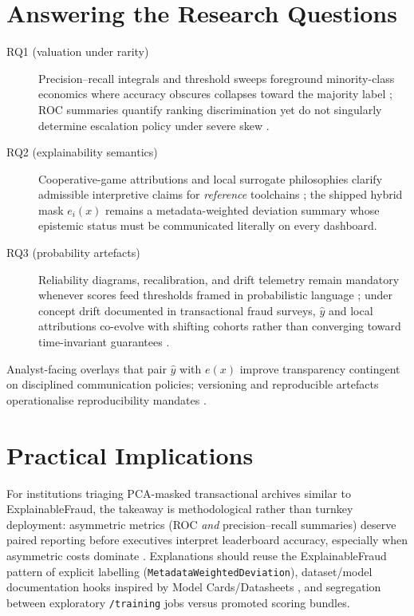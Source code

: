 \section{Answering the Research Questions}
\begin{description}
    \item[RQ1 (valuation under rarity)] Precision--recall integrals and threshold sweeps foreground minority-class economics where accuracy obscures collapses toward the majority label \cite{davis_goadrich_icml06,fraud_handbook}; ROC summaries quantify ranking discrimination yet do not singularly determine escalation policy under severe skew \cite{davis_goadrich_icml06}.
    \item[RQ2 (explainability semantics)] Cooperative-game attributions and local surrogate philosophies clarify admissible interpretive claims for \emph{reference} toolchains \cite{lime_original,shap_original,slack2020_fooling_lime_shap}; the shipped hybrid mask $e_i(x)$ remains a metadata-weighted deviation summary whose epistemic status must be communicated literally on every dashboard.
    \item[RQ3 (probability artefacts)] Reliability diagrams, recalibration, and drift telemetry remain mandatory whenever scores feed thresholds framed in probabilistic language \cite{niculescu_caruana_calib2005}; under concept drift documented in transactional fraud surveys, $\hat{y}$ and local attributions co-evolve with shifting cohorts rather than converging toward time-invariant guarantees \cite{lucas_jurgovsky_ccfraud_survey2020}.
\end{description}

Analyst-facing overlays that pair $\hat{y}$ with $e(x)$ improve transparency contingent on disciplined communication policies; versioning and reproducible artefacts operationalise reproducibility mandates \cite{xai_survey}.

\section{Practical Implications}
For institutions triaging PCA-masked transactional archives similar to ExplainableFraud, the takeaway is methodological rather than turnkey deployment: asymmetric metrics (ROC \emph{and} precision--recall summaries) deserve paired reporting before executives interpret leaderboard accuracy, especially when asymmetric costs dominate \cite{davis_goadrich_icml06,fraud_handbook}. Explanations should reuse the ExplainableFraud pattern of explicit labelling (\texttt{MetadataWeightedDeviation}), dataset/model documentation hooks inspired by Model Cards/Datasheets \cite{mitchell2019model_cards,gebru2021datasheets}, and segregation between exploratory \texttt{/training} jobs versus promoted scoring bundles.

